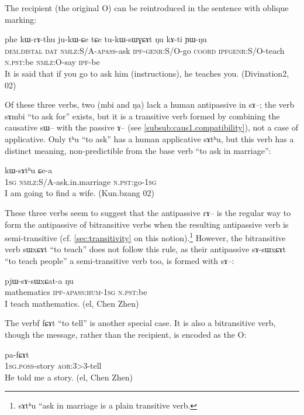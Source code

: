 \documentclass[oldfontcommands,oneside,a4paper,11pt]{memoir}
\newcommand{\ipa}[1]{{\phon #1}} %
\newcommand{\apass}{\textsc{apass}}
\newcommand{\aor}{\textsc{aor}}
\newcommand{\coord}{\textsc{coord}}
\newcommand{\dat}{\textsc{dat}}
\newcommand{\dem}{\textsc{dem}}
\newcommand{\genr}{\textsc{genr}}
\newcommand{\ipf}{\textsc{ipf}}
\newcommand{\nmlz}{\textsc{nmlz}}
\newcommand{\npst}{\textsc{n.pst}}
\newcommand{\poss}{\textsc{poss}}
\newcommand{\sg}{\textsc{sg}}
\begin{document}
The recipient (the original O) can be reintroduced in the sentence with oblique marking:

 
 \begin{exe}
\ex
\gll   \ipa{nɯnɯ} 	\ipa{phe} 	\ipa{kɯ-rɤ-thu} 	\ipa{ju-kɯ-ɕe} 	\ipa{tɕe} 	\ipa{tu-kɯ-sɯɣɕɤt} 	\ipa{ŋu} 	\ipa{kɤ-ti} 	\ipa{ɲɯ-ŋu}    \\
\dem{}.\textsc{distal} \dat{} \nmlz{}:S/A-\apass{}-ask \ipf{}-\genr{}:S/O-go \coord{} \ipf{}\genr{}:S/O-teach \npst{}:be \nmlz{}:O-say \ipf{}-be\\
 \glt   It is said that if you go  to ask him (instructions), he teaches you. (Divination2, 02)
\end{exe} 


Of these three verbs, two (\ipa{mbi} and \ipa{ŋa}) lack a human antipassive in \ipa{sɤ}--; the verb \ipa{sɤmbi} ``to ask for'' exists, but it is a transitive verb formed by combining the causative \ipa{sɯ}-- with the passive \ipa{ɤ}-- (see \ref{subsub:caus1.compatibility}), not a case of applicative. Only \ipa{tʰu} ``to ask'' has a human applicative \ipa{sɤtʰu}, but this verb has a distinct meaning, non-predictible from the base verb ``to ask in marriage'':
 
 \begin{exe}
\ex
\gll   \ipa{aʑo} 	\ipa{kɯ-sɤtʰu} 	\ipa{ɕe-a}     \\
 1\sg{} \nmlz{}:S/A-ask.in.marriage \npst{}:go-1\sg{}  \\
 \glt   I am going to find a wife. (Kun.bzang 02)
\end{exe} 


These three verbs seem to suggest that   the antipassive \ipa{rɤ}-- is the regular way to form the antipassive of  bitransitive verbs  when the resulting antipassive verb is semi-transitive (cf. \ref{sec:transitivity} on this notion).\footnote{\ipa{sɤtʰu} ``ask in marriage is a plain transitive verb.} However, the bitransitive verb    \ipa{sɯxɕɤt} ``to teach''   does not follow this rule, as their antipassive  \ipa{sɤ-sɯxɕɤt} ``to teach people'' a semi-transitive verb too, is formed with \ipa{sɤ}--:
 
 \begin{exe}
\ex
\gll   \ipa{tɤrtsɯz} \ipa{pjɯ-sɤ-sɯxɕat-a} \ipa{ŋu} \\
   mathematics \ipf{}-\apass{}:\textsc{hum}-1\sg{} \npst{}:be \\
 \glt    I teach mathematics. (el, Chen Zhen)
\end{exe} 


The verbf \ipa{fɕɤt} ``to tell'' is another special case. It is also a bitransitive verb, though the message, rather than the recipient, is encoded as the O:
  \begin{exe}
\ex
\gll   \ipa{a-χpi} \ipa{pa-fɕɤt}    \\
      1\sg{}.\poss{}-story \aor{}:3>3-tell   \\
 \glt   He told me a story. (el, Chen Zhen)
\end{exe} 
\end{document}
